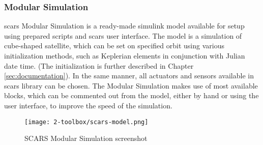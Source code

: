     \subsubsection{Modular Simulation}
        \ac{scars} Modular Simulation is a ready-made simulink model available for setup using prepared scripts and \ac{scars} user interface. The model is a simulation of cube-shaped satellite, which can be set on specified orbit using various initialization methods, such as Keplerian elements in conjunction with Julian date time. (The initialization is further described in Chapter \ref{sec:documentation}). In the same manner, all actuators and sensors available in \ac{scars} library can be chosen. The Modular Simulation makes use of most available blocks, which can be commented out from the model, either by hand or using the user interface, to improve the speed of the simulation.

        \begin{figure}[H]
            \centering
            \texttt{[image: 2-toolbox/scars-model.png]}
            \caption{SCARS Modular Simulation screenshot}
            \label{fig:scars-model}
        \end{figure}
